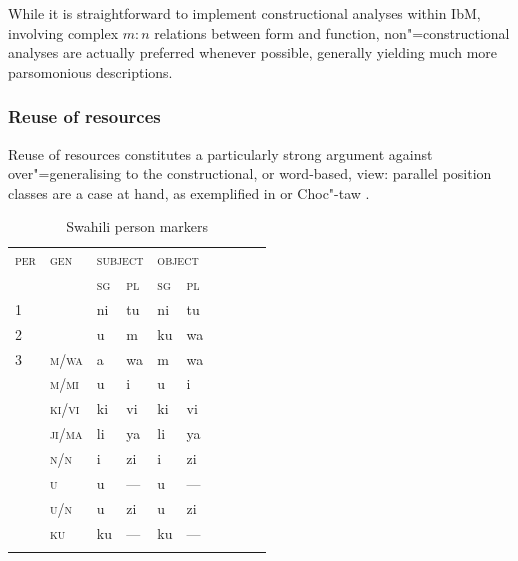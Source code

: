\documentclass[output=paper
	        ,collection
	        ,collectionchapter
 	        ,biblatex
                ,babelshorthands
                ,newtxmath
                ,draftmode
                ,colorlinks, citecolor=brown
]{langscibook}
\begin{document}
\begin{exe}
\begin{xlist}
\begin{exe}
\begin{xlist}
While it is straightforward to implement constructional analyses
within IbM, involving complex $m:n$ relations between form and
function, non"=constructional analyses are actually preferred whenever
possible, generally yielding much more parsomonious descriptions.

\subsubsection{Reuse of resources}

Reuse of resources constitutes a particularly strong argument
against over"=generalising to the constructional, or word-based, view: parallel
position classes are a case at hand, as exemplified in 
\citep{Stump93,Crysmann:Bonami:2016} or Choc"-taw \citep{broadwell:2017}. 

\begin{table}[hbt]
  \centering
  \small
  \begin{tabular}{llllllllll}
    \lsptoprule
    \textsc{per} & \textsc{gen} & \multicolumn{2}{l}{\textsc{subject}} &
                                                                         \multicolumn{2}{l}{\textsc{object}}\\%
                 & & \textsc{sg} & \textsc{pl} & \textsc{sg} & \textsc{pl}\\%
    \midrule
    1	&       & ni & tu  & ni & tu\\%
    2	&       & u	 & m   & ku & wa\\%
    3	& \textsc{m/wa}  & a	 & wa  & m  & wa\\%
                 & \textsc{m/mi}	& u  & i   & u  & i \\%
                 & \textsc{ki/vi}	& ki & vi  & ki & vi \\%
                 & \textsc{ji/ma} & li & ya  & li & ya \\%
                 & \textsc{n/n} & i    & zi  & i  & zi \\%
                 & \textsc{u}     & u  & --- & u  & --- \\%
                 & \textsc{u/n}   & u  & zi  & u  & zi  \\%
                 & \textsc{ku}    & ku & --- & ku & --- \\%
    \lspbottomrule
\end{tabular}
  \caption{Swahili person markers \citep[143]{Stump93}} \label{ex:SwaPer} 


\end{table}
\end{xlist}
\end{exe}
\end{xlist}
\end{exe}
\end{document}

